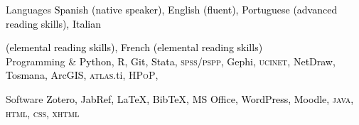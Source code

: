 





\begin{cvskills}

\cvskill
{Languages} 
{\textcolor{black}{Spanish (native speaker), English (fluent), Portuguese (advanced reading skills), Italian}} 

\cvskill
{} 
{\textcolor{black}{(elemental reading skills), French (elemental reading skills)}} \\

\cvskill
{Programming \&} 
{\textcolor{black}{Python, R, Git, Stata, {\scshape spss/pspp}, Gephi, {\scshape ucinet}, NetDraw, Tosmana, ArcGIS, {\scshape atlas}.ti}, {\scshape HPoP},}

\cvskill
{Software} 
{\textcolor{black}{Zotero, JabRef, {\LaTeX}, Bib{\TeX}, MS Office, WordPress, Moodle, {\scshape java}, {\scshape html}, {\scshape css}, {\scshape xhtml}}} \\

\end{cvskills}
